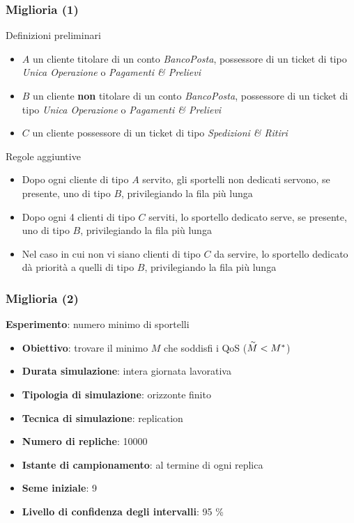 \documentclass[
	usepdftitle=false,
	xcolor={table, dvipsnames},
	hyperref={
		pdftitle={Studio delle prestazioni di un Ufficio Postale ispirato a Poste Italiane},
    	pdfauthor={A. Chillotti, C. Cuffaro e S. Tiberi}
    }
]{beamer}
\newcommand{\uo}{\textsl{Unica Operazione}}
\newcommand{\pp}{\textsl{Pagamenti \& Prelievi}}
\newcommand{\sr}{\textsl{Spedizioni \& Ritiri}}
\begin{document}
\begin{frame}
\frametitle{Miglioria (1)}
\begin{block}{Definizioni preliminari}
\begin{itemize}
\item $A$ un cliente titolare di un conto \textsl{BancoPosta}, possessore di un ticket di tipo \uo{} o \pp{}
\item $B$ un cliente \textbf{non} titolare di un conto \textsl{BancoPosta}, possessore di un ticket di tipo \uo{} o \pp{}
\item $C$ un cliente possessore di un ticket di tipo \sr{}
\end{itemize}
\end{block}
\begin{block}{Regole aggiuntive}
\begin{itemize}
\item Dopo ogni cliente di tipo $A$ servito, gli sportelli non dedicati servono, se presente, uno di tipo $B$, privilegiando la fila più lunga 
\item Dopo ogni 4 clienti di tipo $C$ serviti, lo sportello dedicato serve, se presente, uno di tipo $B$, privilegiando la fila più lunga
\item Nel caso in cui non vi siano clienti di tipo $C$ da servire, lo sportello dedicato dà priorità a quelli di tipo $B$, privilegiando la fila più lunga
\end{itemize}
\end{block}
\end{frame}

\begin{frame}
\frametitle{Miglioria (2)}
\begin{block}{\textbf{Esperimento}: numero minimo di sportelli}
\begin{itemize}
\item \textbf{Obiettivo}: trovare il minimo $M$ che soddisfi i QoS ($\accentset{\sim}{M} < M^*$)
\item \textbf{Durata simulazione}: intera giornata lavorativa
\item \textbf{Tipologia di simulazione}: orizzonte finito
\item \textbf{Tecnica di simulazione}: replication
\item \textbf{Numero di repliche}: 10000
\item \textbf{Istante di campionamento}: al termine di ogni replica
\item \textbf{Seme iniziale}: 9
\item \textbf{Livello di confidenza degli intervalli}: 95 \%
\end{itemize}
\end{block}
\end{frame}
\end{document}
